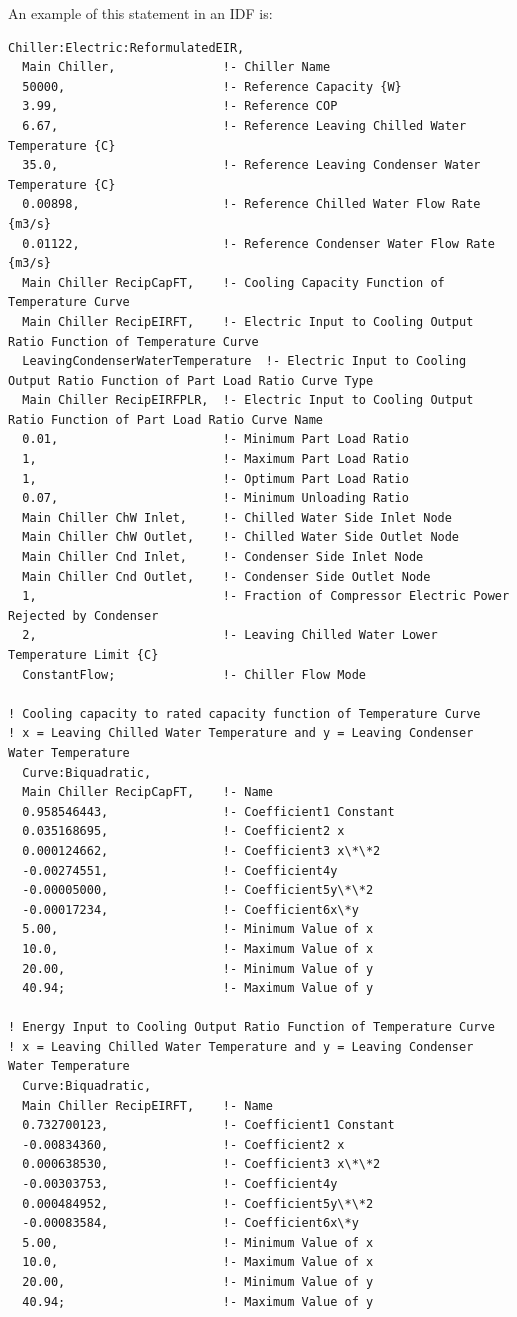 An example of this statement in an IDF is:

\begin{lstlisting}
Chiller:Electric:ReformulatedEIR,
  Main Chiller,               !- Chiller Name
  50000,                      !- Reference Capacity {W}
  3.99,                       !- Reference COP
  6.67,                       !- Reference Leaving Chilled Water Temperature {C}
  35.0,                       !- Reference Leaving Condenser Water Temperature {C}
  0.00898,                    !- Reference Chilled Water Flow Rate {m3/s}
  0.01122,                    !- Reference Condenser Water Flow Rate {m3/s}
  Main Chiller RecipCapFT,    !- Cooling Capacity Function of Temperature Curve
  Main Chiller RecipEIRFT,    !- Electric Input to Cooling Output Ratio Function of Temperature Curve
  LeavingCondenserWaterTemperature  !- Electric Input to Cooling Output Ratio Function of Part Load Ratio Curve Type
  Main Chiller RecipEIRFPLR,  !- Electric Input to Cooling Output Ratio Function of Part Load Ratio Curve Name
  0.01,                       !- Minimum Part Load Ratio
  1,                          !- Maximum Part Load Ratio
  1,                          !- Optimum Part Load Ratio
  0.07,                       !- Minimum Unloading Ratio
  Main Chiller ChW Inlet,     !- Chilled Water Side Inlet Node
  Main Chiller ChW Outlet,    !- Chilled Water Side Outlet Node
  Main Chiller Cnd Inlet,     !- Condenser Side Inlet Node
  Main Chiller Cnd Outlet,    !- Condenser Side Outlet Node
  1,                          !- Fraction of Compressor Electric Power Rejected by Condenser
  2,                          !- Leaving Chilled Water Lower Temperature Limit {C}
  ConstantFlow;               !- Chiller Flow Mode

! Cooling capacity to rated capacity function of Temperature Curve
! x = Leaving Chilled Water Temperature and y = Leaving Condenser Water Temperature
  Curve:Biquadratic,
  Main Chiller RecipCapFT,    !- Name
  0.958546443,                !- Coefficient1 Constant
  0.035168695,                !- Coefficient2 x
  0.000124662,                !- Coefficient3 x\*\*2
  -0.00274551,                !- Coefficient4y
  -0.00005000,                !- Coefficient5y\*\*2
  -0.00017234,                !- Coefficient6x\*y
  5.00,                       !- Minimum Value of x
  10.0,                       !- Maximum Value of x
  20.00,                      !- Minimum Value of y
  40.94;                      !- Maximum Value of y

! Energy Input to Cooling Output Ratio Function of Temperature Curve
! x = Leaving Chilled Water Temperature and y = Leaving Condenser Water Temperature
  Curve:Biquadratic,
  Main Chiller RecipEIRFT,    !- Name
  0.732700123,                !- Coefficient1 Constant
  -0.00834360,                !- Coefficient2 x
  0.000638530,                !- Coefficient3 x\*\*2
  -0.00303753,                !- Coefficient4y
  0.000484952,                !- Coefficient5y\*\*2
  -0.00083584,                !- Coefficient6x\*y
  5.00,                       !- Minimum Value of x
  10.0,                       !- Maximum Value of x
  20.00,                      !- Minimum Value of y
  40.94;                      !- Maximum Value of y


\end{lstlisting}
